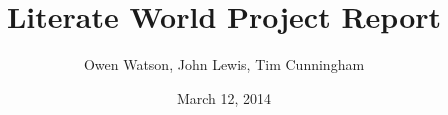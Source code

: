 \documentclass[12pt, letterpaper]{report}
\author{Owen Watson, John Lewis, Tim Cunningham}
\title{Literate World Project Report}
\date{March 12, 2014}
\begin{document}
	\begin{titlepage}
	\Huge \maketitle \par
	\end{titlepage}
	
\end{document}
